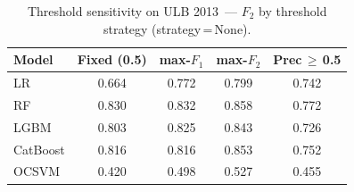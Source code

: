 \begin{table}[ht]
\centering
\caption{Threshold sensitivity on ULB 2013~--- $F_2$ by threshold strategy (strategy\,=\,None).}
\label{tab:threshold_ulb_f2}
\begin{tabular}{l c c c c}
\toprule
Model & Fixed (0.5) & max-$F_1$ & max-$F_2$ & Prec\,$\geq$\,0.5 \\
\midrule
LR         & 0.664 & 0.772 & 0.799 & 0.742 \\
RF         & 0.830 & 0.832 & 0.858 & 0.772 \\
LGBM       & 0.803 & 0.825 & 0.843 & 0.726 \\
CatBoost   & 0.816 & 0.816 & 0.853 & 0.752 \\
OCSVM      & 0.420 & 0.498 & 0.527 & 0.455 \\
\bottomrule
\end{tabular}
\end{table}